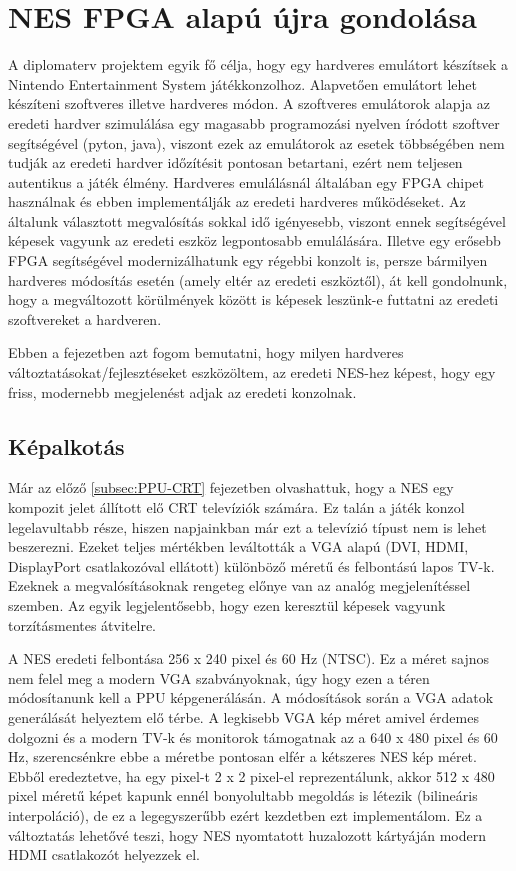 \chapter{NES FPGA alapú újra gondolása}

A diplomaterv projektem egyik fő célja, hogy egy hardveres emulátort készítsek a Nintendo Entertainment System játékkonzolhoz. Alapvetően emulátort lehet készíteni szoftveres illetve hardveres módon. A szoftveres emulátorok alapja az eredeti hardver szimulálása egy magasabb programozási nyelven íródott szoftver segítségével (pyton, java), viszont ezek az emulátorok az esetek többségében nem tudják az eredeti hardver időzítésit pontosan betartani, ezért nem teljesen autentikus a játék élmény. Hardveres emulálásnál általában egy FPGA chipet használnak és ebben implementálják az eredeti hardveres működéseket. Az általunk választott megvalósítás sokkal idő igényesebb, viszont ennek segítségével képesek vagyunk az eredeti eszköz legpontosabb emulálására. Illetve egy erősebb FPGA segítségével modernizálhatunk egy régebbi konzolt is, persze bármilyen hardveres módosítás esetén (amely eltér az eredeti eszköztől), át kell gondolnunk, hogy a megváltozott körülmények között is képesek leszünk-e futtatni az eredeti szoftvereket a hardveren. 

Ebben a fejezetben azt fogom bemutatni, hogy milyen hardveres változtatásokat/fejlesztéseket eszközöltem, az eredeti NES-hez képest, hogy egy friss, modernebb megjelenést adjak az eredeti konzolnak.

\section{Képalkotás}

Már az előző \ref{subsec:PPU-CRT} fejezetben olvashattuk, hogy a NES egy kompozit jelet állított elő CRT televíziók számára. Ez talán a játék konzol legelavultabb része, hiszen napjainkban már ezt a televízió típust nem is lehet beszerezni. Ezeket teljes mértékben leváltották a VGA alapú (DVI, HDMI, DisplayPort csatlakozóval ellátott) különböző méretű és felbontású lapos TV-k. Ezeknek a megvalósításoknak rengeteg előnye van az analóg megjelenítéssel szemben. Az egyik legjelentősebb, hogy ezen keresztül képesek vagyunk torzításmentes átvitelre.

A NES eredeti felbontása 256 x 240 pixel és 60 Hz (NTSC). Ez a  méret sajnos nem felel meg a modern VGA szabványoknak, úgy hogy ezen a téren módosítanunk kell a PPU képgenerálásán. A módosítások során a VGA adatok generálását helyeztem elő térbe. A legkisebb VGA kép méret amivel érdemes dolgozni és a modern TV-k és monitorok támogatnak az a 640 x 480 pixel és 60 Hz, szerencsénkre ebbe a méretbe pontosan elfér a kétszeres NES kép méret. Ebből eredeztetve, ha egy pixel-t 2 x 2 pixel-el reprezentálunk, akkor 512 x 480 pixel méretű képet kapunk ennél bonyolultabb megoldás is létezik (bilineáris interpoláció), de ez a legegyszerűbb ezért kezdetben ezt implementálom. Ez a változtatás lehetővé teszi, hogy NES nyomtatott huzalozott kártyáján modern HDMI csatlakozót helyezzek el. 

